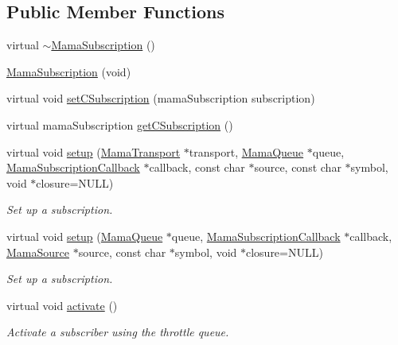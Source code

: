 \subsection*{Public Member Functions}
\begin{DoxyCompactItemize}
\item 
virtual \hyperlink{classWombat_1_1MamaSubscription_ad5dcdc6ddc4cda8263946a226d2423f2}{$\sim$MamaSubscription} ()
\item 
\hyperlink{classWombat_1_1MamaSubscription_a65c320b11e7b12295d7c1c80029c61c2}{MamaSubscription} (void)
\item 
virtual void \hyperlink{classWombat_1_1MamaSubscription_a5241d85ab4b57cd8306a3a4bdb62b380}{setCSubscription} (mamaSubscription subscription)
\item 
virtual mamaSubscription \hyperlink{classWombat_1_1MamaSubscription_a8dc9a0e1da068e0d2ef0ec2520d33dc5}{getCSubscription} ()
\item 
virtual void \hyperlink{classWombat_1_1MamaSubscription_a856510d1c73d4850c0f069a834cd839d}{setup} (\hyperlink{classWombat_1_1MamaTransport}{MamaTransport} $\ast$transport, \hyperlink{classWombat_1_1MamaQueue}{MamaQueue} $\ast$queue, \hyperlink{classWombat_1_1MamaSubscriptionCallback}{MamaSubscriptionCallback} $\ast$callback, const char $\ast$source, const char $\ast$symbol, void $\ast$closure=NULL)
\begin{DoxyCompactList}\small\item\em Set up a subscription. \item\end{DoxyCompactList}\item 
virtual void \hyperlink{classWombat_1_1MamaSubscription_a944f05bd8717893b18eca077bcc3684c}{setup} (\hyperlink{classWombat_1_1MamaQueue}{MamaQueue} $\ast$queue, \hyperlink{classWombat_1_1MamaSubscriptionCallback}{MamaSubscriptionCallback} $\ast$callback, \hyperlink{classWombat_1_1MamaSource}{MamaSource} $\ast$source, const char $\ast$symbol, void $\ast$closure=NULL)
\begin{DoxyCompactList}\small\item\em Set up a subscription. \item\end{DoxyCompactList}\item 
virtual void \hyperlink{classWombat_1_1MamaSubscription_abe7de53adbc4d0173692bae6073d985d}{activate} ()
\begin{DoxyCompactList}\small\item\em Activate a subscriber using the throttle queue. \item\end{DoxyCompactList}\item 

\end{DoxyCompactItemize}
